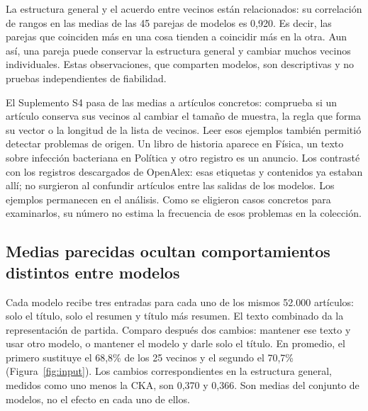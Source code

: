 \documentclass[12pt]{article}
\begin{document}
La estructura general y el acuerdo entre vecinos están relacionados: su correlación de rangos en las medias de las 45 parejas de modelos es 0,920. Es decir, las parejas que coinciden más en una cosa tienden a coincidir más en la otra. Aun así, una pareja puede conservar la estructura general y cambiar muchos vecinos individuales. Estas observaciones, que comparten modelos, son descriptivas y no pruebas independientes de fiabilidad.

El Suplemento S4 pasa de las medias a artículos concretos: comprueba si un artículo conserva sus vecinos al cambiar el tamaño de muestra, la regla que forma su vector o la longitud de la lista de vecinos. Leer esos ejemplos también permitió detectar problemas de origen. Un libro de historia aparece en Física, un texto sobre infección bacteriana en Política y otro registro es un anuncio. Los contrasté con los registros descargados de OpenAlex: esas etiquetas y contenidos ya estaban allí; no surgieron al confundir artículos entre las salidas de los modelos. Los ejemplos permanecen en el análisis. Como se eligieron casos concretos para examinarlos, su número no estima la frecuencia de esos problemas en la colección.

\FloatBarrier
\subsection{Medias parecidas ocultan comportamientos distintos entre modelos}
Cada modelo recibe tres entradas para cada uno de los mismos 52.000 artículos: solo el título, solo el resumen y título más resumen. El texto combinado da la representación de partida. Comparo después dos cambios: mantener ese texto y usar otro modelo, o mantener el modelo y darle solo el título. En promedio, el primero sustituye el 68,8\% de los 25 vecinos y el segundo el 70,7\% (Figura~\ref{fig:input}). Los cambios correspondientes en la estructura general, medidos como uno menos la CKA, son 0,370 y 0,366. Son medias del conjunto de modelos, no el efecto en cada uno de ellos.
\end{document}
